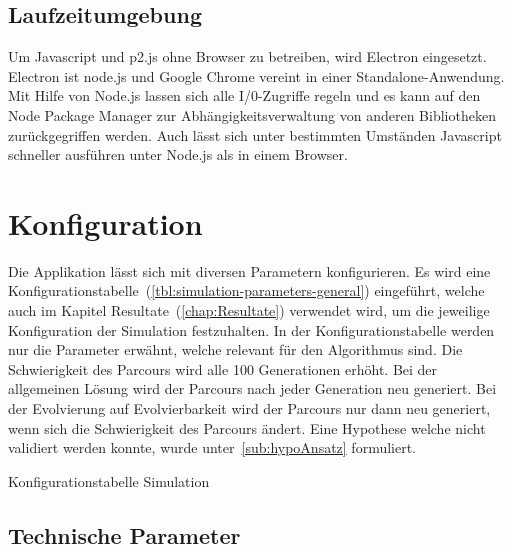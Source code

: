     \subsection{Laufzeitumgebung}


      Um Javascript und p2.js ohne Browser zu betreiben, wird Electron eingesetzt.
      Electron ist node.js und Google Chrome vereint in einer Standalone-Anwendung.
      Mit Hilfe von Node.js lassen sich alle I/0-Zugriffe regeln und es kann auf den
      Node Package Manager zur Abhängigkeitsverwaltung von anderen Bibliotheken zurückgegriffen werden.
      Auch lässt sich unter bestimmten Umständen Javascript schneller ausführen unter Node.js als in einem Browser.

  \section{Konfiguration\label{sec:Konfiguration}}

    Die Applikation lässt sich mit diversen Parametern konfigurieren.
    Es wird eine Konfigurationstabelle~(\vref{tbl:simulation-parameters-general}) eingeführt,
    welche auch im Kapitel Resultate~(\vref{chap:Resultate}) verwendet wird,
    um die jeweilige Konfiguration der Simulation festzuhalten. In der Konfigurationstabelle werden nur die Parameter erwähnt,
    welche relevant für den Algorithmus sind. Die Schwierigkeit des Parcours wird alle 100 Generationen erhöht. Bei der allgemeinen Lösung wird der Parcours
    nach jeder Generation neu generiert. Bei der Evolvierung auf Evolvierbarkeit wird der Parcours nur dann neu generiert,
    wenn sich die Schwierigkeit des Parcours ändert.
    Eine Hypothese welche nicht validiert werden konnte, wurde unter~\vref{sub:hypoAnsatz} formuliert.

    \begin{table}[H]
      
      \caption{Konfigurationstabelle Simulation\label{tbl:simulation-parameters-general}}
    \end{table}

    \subsection{Technische Parameter\label{sub:techParams}}

